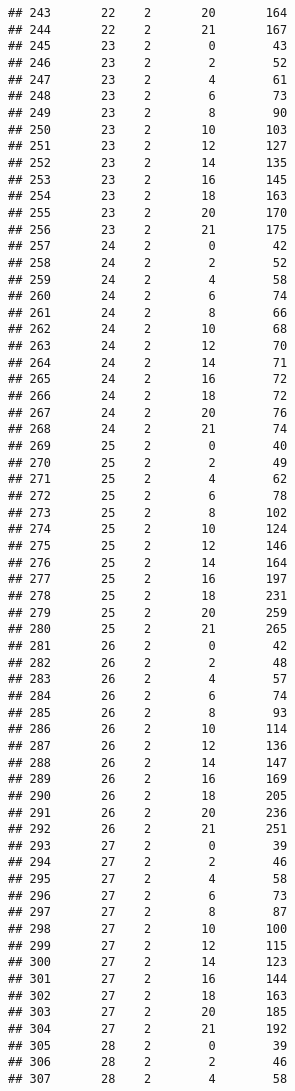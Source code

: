 \documentclass[
]{article}
\begin{document}
\begin{verbatim}
## 243       22    2       20       164
## 244       22    2       21       167
## 245       23    2        0        43
## 246       23    2        2        52
## 247       23    2        4        61
## 248       23    2        6        73
## 249       23    2        8        90
## 250       23    2       10       103
## 251       23    2       12       127
## 252       23    2       14       135
## 253       23    2       16       145
## 254       23    2       18       163
## 255       23    2       20       170
## 256       23    2       21       175
## 257       24    2        0        42
## 258       24    2        2        52
## 259       24    2        4        58
## 260       24    2        6        74
## 261       24    2        8        66
## 262       24    2       10        68
## 263       24    2       12        70
## 264       24    2       14        71
## 265       24    2       16        72
## 266       24    2       18        72
## 267       24    2       20        76
## 268       24    2       21        74
## 269       25    2        0        40
## 270       25    2        2        49
## 271       25    2        4        62
## 272       25    2        6        78
## 273       25    2        8       102
## 274       25    2       10       124
## 275       25    2       12       146
## 276       25    2       14       164
## 277       25    2       16       197
## 278       25    2       18       231
## 279       25    2       20       259
## 280       25    2       21       265
## 281       26    2        0        42
## 282       26    2        2        48
## 283       26    2        4        57
## 284       26    2        6        74
## 285       26    2        8        93
## 286       26    2       10       114
## 287       26    2       12       136
## 288       26    2       14       147
## 289       26    2       16       169
## 290       26    2       18       205
## 291       26    2       20       236
## 292       26    2       21       251
## 293       27    2        0        39
## 294       27    2        2        46
## 295       27    2        4        58
## 296       27    2        6        73
## 297       27    2        8        87
## 298       27    2       10       100
## 299       27    2       12       115
## 300       27    2       14       123
## 301       27    2       16       144
## 302       27    2       18       163
## 303       27    2       20       185
## 304       27    2       21       192
## 305       28    2        0        39
## 306       28    2        2        46
## 307       28    2        4        58

\end{verbatim}
\end{document}

